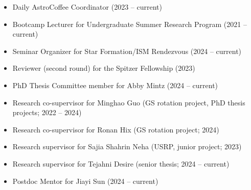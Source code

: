 \documentclass[12pt]{article}
\begin{document}
\begin{itemize}
    \item Daily AstroCoffee Coordinator (2023 -- current)
    \item Bootcamp Lecturer for Undergraduate Summer Research Program (2021 -- current)
    \item Seminar Organizer for Star Formation/ISM Rendezvous (2024 -- current)
    \item Reviewer (second round) for the Spitzer Fellowship (2023)
    \item PhD Thesis Committee member for Abby Mintz (2024 -- current)
    \item Research co-supervisor for Minghao Guo (GS rotation project, PhD thesis projects; 2022 -- 2024)
    \item Research co-supervisor for Ronan Hix (GS rotation project; 2024)
    \item Research supervisor for Sajia Shahrin Neha (USRP, junior project; 2023)
    \item Research supervisor for Tejahni Desire (senior thesis; 2024 -- current)
    \item Postdoc Mentor for Jiayi Sun (2024 -- current)
\end{itemize}
\end{document}
